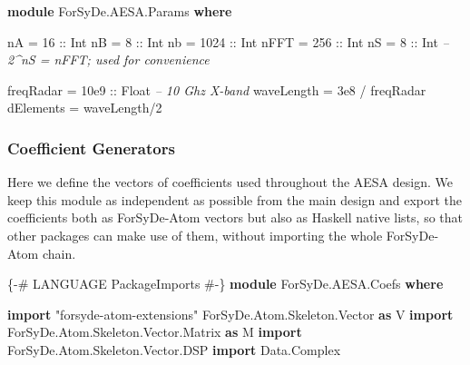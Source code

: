 \documentclass[
  a4paper,
]{article}
\newenvironment{Shaded}{}{}
\newcommand{\CommentTok}[1]{\textcolor[rgb]{0.38,0.63,0.69}{\textit{#1}}}
\newcommand{\DataTypeTok}[1]{\textcolor[rgb]{0.56,0.13,0.00}{#1}}
\newcommand{\DecValTok}[1]{\textcolor[rgb]{0.25,0.63,0.44}{#1}}
\newcommand{\FloatTok}[1]{\textcolor[rgb]{0.25,0.63,0.44}{#1}}
\newcommand{\FunctionTok}[1]{\textcolor[rgb]{0.02,0.16,0.49}{#1}}
\newcommand{\KeywordTok}[1]{\textcolor[rgb]{0.00,0.44,0.13}{\textbf{#1}}}
\newcommand{\NormalTok}[1]{#1}
\newcommand{\OtherTok}[1]{\textcolor[rgb]{0.00,0.44,0.13}{#1}}
\begin{document}
\begin{Shaded}
\begin{Highlighting}[numbers=left,,firstnumber=6,]
\KeywordTok{module} \DataTypeTok{ForSyDe.AESA.Params} \KeywordTok{where}

\NormalTok{nA   }\FunctionTok{=}   \DecValTok{16}\OtherTok{ ::} \DataTypeTok{Int}
\NormalTok{nB   }\FunctionTok{=}    \DecValTok{8}\OtherTok{ ::} \DataTypeTok{Int}
\NormalTok{nb   }\FunctionTok{=} \DecValTok{1024}\OtherTok{ ::} \DataTypeTok{Int}
\NormalTok{nFFT }\FunctionTok{=}  \DecValTok{256}\OtherTok{ ::} \DataTypeTok{Int}
\NormalTok{nS   }\FunctionTok{=}    \DecValTok{8}\OtherTok{ ::} \DataTypeTok{Int} \CommentTok{-- 2^nS = nFFT; used for convenience}

\NormalTok{freqRadar  }\FunctionTok{=} \FloatTok{10e9}\OtherTok{ ::} \DataTypeTok{Float} \CommentTok{-- 10 Ghz X-band}
\NormalTok{waveLength }\FunctionTok{=} \FloatTok{3e8} \FunctionTok{/}\NormalTok{ freqRadar}
\NormalTok{dElements  }\FunctionTok{=}\NormalTok{ waveLength}\FunctionTok{/}\DecValTok{2}
\end{Highlighting}
\end{Shaded}

\hypertarget{sec:coefs-atom}{%
\subsubsection{Coefficient Generators}\label{sec:coefs-atom}}

Here we define the vectors of coefficients used throughout the AESA
design. We keep this module as independent as possible from the main
design and export the coefficients both as ForSyDe-Atom vectors but also
as Haskell native lists, so that other packages can make use of them,
without importing the whole ForSyDe-Atom chain.

\begin{Shaded}
\begin{Highlighting}[numbers=left,,firstnumber=8,]
\OtherTok{\{-# LANGUAGE PackageImports #-\}}
\KeywordTok{module} \DataTypeTok{ForSyDe.AESA.Coefs} \KeywordTok{where}
\end{Highlighting}
\end{Shaded}

\begin{Shaded}
\begin{Highlighting}[numbers=left,,firstnumber=11,]
\KeywordTok{import}\NormalTok{ "forsyde-atom-extensions" }\DataTypeTok{ForSyDe.Atom.Skeleton.Vector} \KeywordTok{as} \DataTypeTok{V}
\KeywordTok{import} \DataTypeTok{ForSyDe.Atom.Skeleton.Vector.Matrix} \KeywordTok{as} \DataTypeTok{M}
\KeywordTok{import} \DataTypeTok{ForSyDe.Atom.Skeleton.Vector.DSP}
\KeywordTok{import} \DataTypeTok{Data.Complex}
\end{Highlighting}
\end{Shaded}
\end{document}
